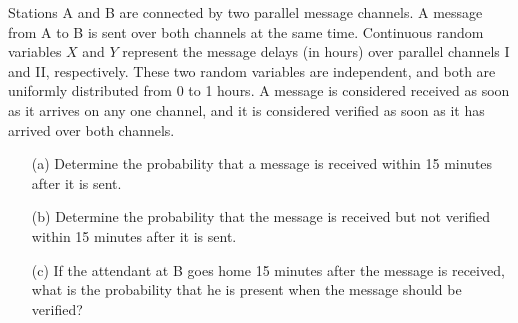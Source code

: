 \begin{exercise}
Stations A and B are connected by two parallel message channels. A message from A to B is sent over both channels at the same time. Continuous random variables \( X \) and \( Y \) represent the message delays (in hours) over parallel channels I and II, respectively. These two random variables are independent, and both are uniformly distributed from 0 to 1 hours. A message is considered received as soon as it arrives on any one channel, and it is considered verified as soon as it has arrived over both channels.

\begin{enumerate}
    \item[(a)] Determine the probability that a message is received within 15 minutes after it is sent.
    \item[(b)] Determine the probability that the message is received but not verified within 15 minutes after it is sent.
    \item[(c)] If the attendant at B goes home 15 minutes after the message is received, what is the probability that he is present when the message should be verified?
\end{enumerate}
\end{exercise}


